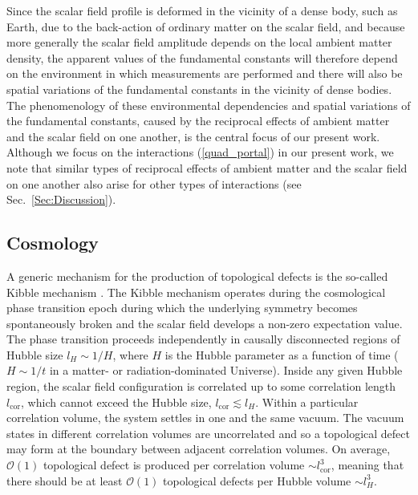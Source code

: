 \documentclass[aps,prd,onecolumn,nofootinbib]{revtex4-2} %
\begin{document}
Since the scalar field profile is deformed in the vicinity of a dense body, such as Earth, due to the back-action of ordinary matter on the scalar field, and because more generally the scalar field amplitude depends on the local ambient matter density, the apparent values of the fundamental constants will therefore depend on the environment in which measurements are performed and there will also be spatial variations of the fundamental constants in the vicinity of dense bodies. 
The phenomenology of these environmental dependencies and spatial variations of the fundamental constants, caused by the reciprocal effects of ambient matter and the scalar field on one another, is the central focus of our present work. 
Although we focus on the interactions (\ref{quad_portal}) in our present work, we note that similar types of reciprocal effects of ambient matter and the scalar field on one another also arise for other types of interactions (see Sec.~\ref{Sec:Discussion}). 




\subsection{Cosmology}
\label{Sec:Main_Cosmology}
A generic mechanism for the production of topological defects is the so-called Kibble mechanism \cite{Kibble_1976}. 
The Kibble mechanism operates during the cosmological phase transition epoch during which the underlying symmetry becomes spontaneously broken and the scalar field develops a non-zero expectation value. 
The phase transition proceeds independently in causally disconnected regions of Hubble size $l_H \sim 1/H$, where $H$ is the Hubble parameter as a function of time ($H \sim 1/t$ in a matter- or radiation-dominated Universe). 
Inside any given Hubble region, the scalar field configuration is correlated up to some correlation length $l_\textrm{cor}$, which cannot exceed the Hubble size, $l_\textrm{cor} \lesssim l_H$. 
Within a particular correlation volume, the system settles in one and the same vacuum. 
The vacuum states in different correlation volumes are uncorrelated and so a topological defect may form at the boundary between adjacent correlation volumes. 
On average, $\mathcal{O}(1)$ topological defect is produced per correlation volume $\sim l_\textrm{cor}^3$, meaning that there should be at least $\mathcal{O}(1)$ topological defects per Hubble volume $\sim l_H^3$. 
\end{document}
